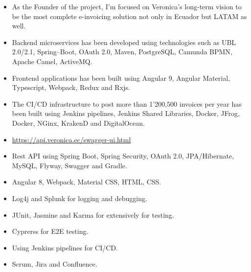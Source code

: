 \documentclass[10pt,a4paper,ragged2e]{altacv}
\begin{document}
\begin{itemize}
    \item As the Founder of the project, I’m focused on Veronica’s long-term vision to be the most complete e-invoicing solution not only in Ecuador but LATAM as well.
    \item Backend microservices has been developed using technologies such as UBL 2.0/2.1, Spring--Boot, OAuth 2.0, Maven, PostgreSQL, Camunda BPMN, Apache Camel, ActiveMQ.
    \item Frontend applications has been built using Angular 9, Angular Material, Typescript, Webpack, Redux and Rxjs.
    \item The CI/CD infrastructure to post more than 1'200,500 invoices per year has been built using Jenkins pipelines, Jenkins Shared Libraries, Docker, JFrog, Docker, NGinx, KrakenD and DigitalOcean.
    \item \url{https://api.veronica.ec/swagger-ui.html}
\end{itemize}

\vspace{10px}

\begin{itemize}
    \item Rest API using Spring Boot, Spring Security, OAuth 2.0, JPA/Hibernate, MySQL, Flyway, Swagger and Gradle.
    \item Angular 8, Webpack, Material CSS, HTML, CSS.
    \item Log4j and Splunk for logging and debugging.
    \item JUnit, Jasmine and Karma for extensively for testing.
    \item Cyprerss for E2E testing.
    \item Using Jenkins pipelines for CI/CD.
    \item Scrum, Jira and Confluence.
\end{itemize}

\vspace{10px}
\end{document}
